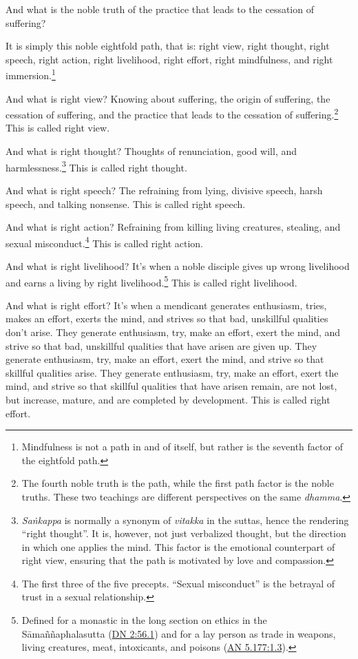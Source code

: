 \documentclass[12pt,openany]{book}%
\begin{document}
And what is the noble truth of the practice that leads to the cessation of suffering? 

It is simply this noble eightfold path, that is: right view, right thought, right speech, right action, right livelihood, right effort, right mindfulness, and right immersion.\footnote{Mindfulness is not a path in and of itself, but rather is the seventh factor of the eightfold path. } 

And what is right view? Knowing about suffering, the origin of suffering, the cessation of suffering, and the practice that leads to the cessation of suffering.\footnote{The fourth noble truth is the path, while the first path factor is the noble truths. These two teachings are different perspectives on the same \textit{dhamma}. } This is called right view. 

And what is right thought? Thoughts of renunciation, good will, and harmlessness.\footnote{\textit{\textsanskrit{Saṅkappa}} is normally a synonym of \textit{vitakka} in the suttas, hence the rendering “right thought”. It is, however, not just verbalized thought, but the direction in which one applies the mind. This factor is the emotional counterpart of right view, ensuring that the path is motivated by love and compassion. } This is called right thought. 

And what is right speech? The refraining from lying, divisive speech, harsh speech, and talking nonsense. This is called right speech. 

And what is right action? Refraining from killing living creatures, stealing, and sexual misconduct.\footnote{The first three of the five precepts. “Sexual misconduct” is the betrayal of trust in a sexual relationship. } This is called right action. 

And what is right livelihood? It’s when a noble disciple gives up wrong livelihood and earns a living by right livelihood.\footnote{Defined for a monastic in the long section on ethics in the \textsanskrit{Sāmaññaphalasutta} (\href{https://suttacentral.net/dn2/en/sujato\#56.1}{DN 2:56.1}) and for a lay person as trade in weapons, living creatures, meat, intoxicants, and poisons (\href{https://suttacentral.net/an5.177/en/sujato\#1.3}{AN 5.177:1.3}). } This is called right livelihood. 

And what is right effort? It’s when a mendicant generates enthusiasm, tries, makes an effort, exerts the mind, and strives so that bad, unskillful qualities don’t arise. They generate enthusiasm, try, make an effort, exert the mind, and strive so that bad, unskillful qualities that have arisen are given up. They generate enthusiasm, try, make an effort, exert the mind, and strive so that skillful qualities arise. They generate enthusiasm, try, make an effort, exert the mind, and strive so that skillful qualities that have arisen remain, are not lost, but increase, mature, and are completed by development. This is called right effort. 
\end{document}
